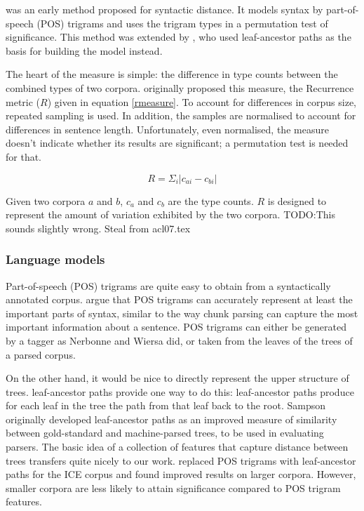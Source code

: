 \documentclass[11pt]{article}
\begin{document}
 was an early method proposed for syntactic
distance.  It models syntax by part-of-speech (POS) trigrams and uses
the trigram types in a permutation test of significance. This method was
extended by , who used 
leaf-ancestor paths as the basis for building the model instead.

The heart of the measure is simple: the difference in type counts
between the combined types of two corpora. 
originally proposed this measure, the {\sc Recurrence}
metric ($R$) given in equation \ref{rmeasure}. To account for differences
in corpus size, repeated sampling is used. In addition, the samples
are normalised to account for differences in sentence length.
Unfortunately, even normalised, the measure doesn't indicate whether
its results are significant; a permutation test is needed for that.

\begin{equation}
R = \Sigma_i |c_{ai} - c_{bi}|
\label{rmeasure}
\end{equation}

Given two corpora $a$ and $b$, $c_a$ and $c_b$ are the type counts.
$R$ is designed to represent the amount of variation exhibited by the two corpora.
TODO:This sounds slightly wrong. Steal from acl07.tex



\subsubsection{Language models}
Part-of-speech (POS) trigrams are quite easy to obtain from a syntactically
annotated corpus.  argue that POS trigrams
can accurately represent at least the important parts of syntax,
similar to the way chunk parsing can capture the most important
information about a sentence. POS trigrams can either be generated by
a tagger as Nerbonne and Wiersa did, or taken from the leaves of
the trees of a parsed corpus.

On the other hand, it would be nice to directly represent the upper
structure of trees.  leaf-ancestor paths provide one way to
do this: leaf-ancestor paths produce for each leaf in the tree the
path from that leaf back to the root. Sampson originally developed
leaf-ancestor paths as an improved measure of similarity between
gold-standard and machine-parsed trees, to be used in evaluating
parsers. The basic idea of a collection of features that capture
distance between trees transfers quite nicely to our
work.  replaced POS trigrams with leaf-ancestor
paths for the ICE corpus and found improved results on larger
corpora. However, smaller corpora are less likely to attain significance
compared to POS trigram features.
\end{document}
